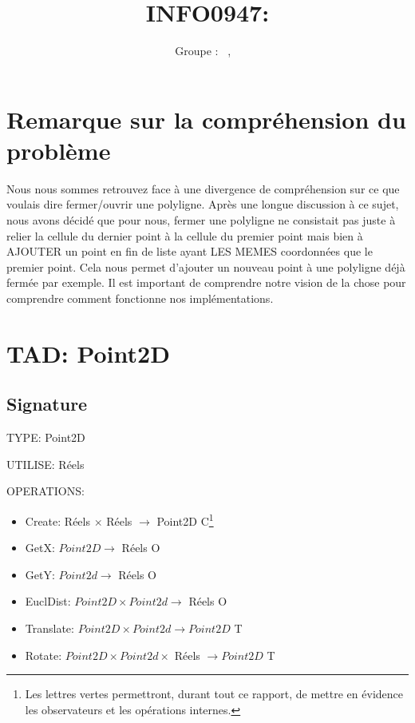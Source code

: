 \documentclass[a4paper, 11pt, oneside]{article}
\title{INFO0947: \intitule}
\author{Groupe \GrNbr : \PrenomUN~\textsc{\NomUN}, \PrenomDEUX~\textsc{\NomDEUX}}
\date{}
\newcommand{\tablemat}{~}
\renewcommand{\tablemat}{\tableofcontents}
\begin{document}
\maketitle
\newpage
\tablemat
\newpage

\section{Remarque sur la compréhension du problème}
Nous nous sommes retrouvez face à une divergence de compréhension sur ce que voulais dire fermer/ouvrir une polyligne. Après une  longue discussion à ce sujet, nous avons décidé que pour nous, fermer une polyligne ne consistait pas juste à relier la cellule du dernier point à la cellule du premier point mais bien à AJOUTER un point en fin de liste ayant LES MEMES coordonnées que le premier point. Cela nous permet d'ajouter un nouveau point à une polyligne déjà fermée par exemple. Il est important de comprendre notre vision de la chose pour comprendre comment fonctionne nos implémentations.


\section{TAD: Point2D}

\subsection{Signature}

\noindent TYPE: Point2D

\noindent UTILISE: Réels 

\noindent OPERATIONS: 
\begin{itemize}
    \item Create: Réels $\times$ Réels $\xrightarrow{}$ Point2D {\color{green} C}\footnote{Les lettres vertes permettront, durant tout ce rapport, de mettre en évidence les observateurs et les opérations internes.}
    \item GetX: $Point2D \xrightarrow{}$ Réels {\color{green} O}
    \item GetY: $Point2d \xrightarrow{}$ Réels {\color{green} O}
    \item EuclDist: $Point2D \times Point2d \xrightarrow{}$ Réels {\color{green} O}
    \item Translate: $Point2D \times Point2d \xrightarrow{} Point2D$ {\color{green} T}
    \item Rotate: $Point2D \times Point2d  \times $ Réels $\xrightarrow{} Point2D $ {\color{green} T}
\end{itemize}
\end{document}
